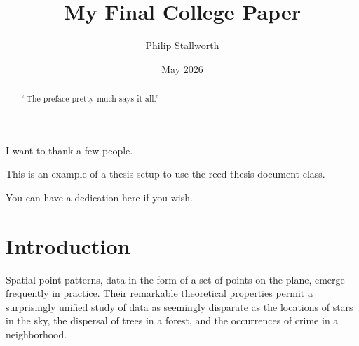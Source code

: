 \documentclass[12pt,twoside]{reedthesis}
\title{My Final College Paper}
\author{Philip Stallworth}
\date{May 2026}
\begin{document}
      \maketitle
  
  \frontmatter %
  \pagestyle{empty} %

      \begin{acknowledgements}
      I want to thank a few people.
    \end{acknowledgements}
  
      \begin{preface}
      This is an example of a thesis setup to use the reed thesis document
      class.
    \end{preface}
  

      \hypersetup{linkcolor=black}
    \setcounter{tocdepth}{2}
    \tableofcontents
  
      \listoftables
  
      \listoffigures
  
      \begin{abstract}
      ``The preface pretty much says it all.''
    \end{abstract}
  
      \begin{dedication}
      You can have a dedication here if you wish.
    \end{dedication}
  
  \mainmatter %
  \pagestyle{fancyplain} %

  \chapter*{Introduction}\label{introduction}
  
  Spatial point patterns, data in the form of a set of points on the
  plane, emerge frequently in practice. Their remarkable theoretical
  properties permit a surprisingly unified study of data as seemingly
  disparate as the locations of stars in the sky, the dispersal of trees
  in a forest, and the occurrences of crime in a neighborhood.
  
\end{document}
